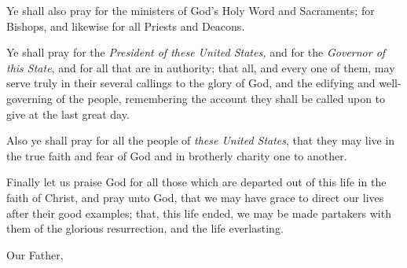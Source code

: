 \ourFather
 
\medskip

\centerline{}


Ye shall also pray for the ministers of God’s Holy Word and Sacraments; for Bishops, and likewise for all Priests and Deacons.

Ye shall pray for the \emph{President of these United States,} and for the \emph{Governor of this State}, and for all that are in authority; that all, and every one of them, may serve truly in their several callings to the glory of God, and the edifying and well-governing of the people, remembering the account they shall be called upon to give at the last great day.

Also ye shall pray for all the people of \emph{these United States}, that they may live in the true faith and fear of God and in brotherly charity one to another.

Finally let us praise God for all those which are departed out of this life in the faith of Christ,  and pray unto God, that we may have grace to direct our lives after their good examples; that, this life ended, we may be made partakers with them of the glorious resurrection, and the life everlasting.

\centerline{Our Father, \etc}


\fleuron

